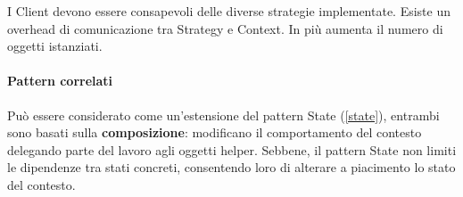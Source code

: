 I Client devono essere consapevoli delle diverse strategie implementate. Esiste un overhead di comunicazione tra Strategy e Context. In più aumenta il numero di oggetti istanziati.

\paragraph{Pattern correlati} Può essere considerato come un'estensione del pattern State (\ref{state}), entrambi sono basati sulla \textbf{composizione}: modificano il comportamento del contesto delegando parte del lavoro agli oggetti helper. Sebbene, il pattern State non limiti le dipendenze tra stati concreti, consentendo loro di alterare a piacimento lo stato del contesto.


\newpage